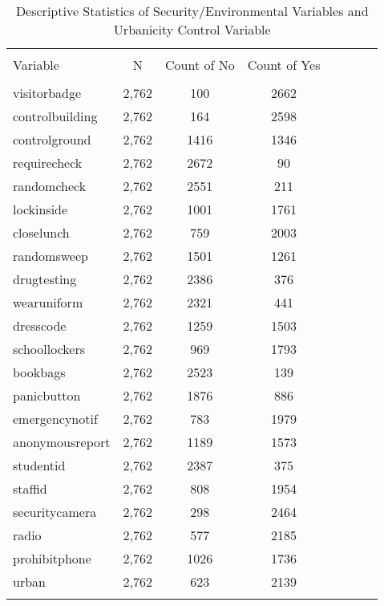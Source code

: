 \documentclass[12pt]{article}
\begin{document}
\begin{landscape}
\begin{table}[!htbp] \centering 
  \caption{Descriptive Statistics of Security/Environmental Variables and Urbanicity Control Variable} 
  \label{} 
\begin{tabular}{@{\extracolsep{5pt}}lccccccc} 
\\[-1.8ex]\hline 
\hline \\[-1.8ex] 
Variable & \multicolumn{1}{c}{N} & \multicolumn{1}{c}{Count of No} & \multicolumn{1}{c}{Count of Yes} \\ 
\hline \\[-1.8ex] 
visitorbadge & 2,762 & 100 & 2662 \\ 
controlbuilding & 2,762 & 164 & 2598 \\ 
controlground & 2,762 & 1416 & 1346 \\ 
requirecheck & 2,762 & 2672 & 90  \\ 
randomcheck & 2,762 & 2551 & 211 \\ 
lockinside & 2,762 & 1001 & 1761 \\ 
closelunch & 2,762 & 759 & 2003 \\ 
randomsweep & 2,762 & 1501 & 1261 \\ 
drugtesting & 2,762 & 2386 & 376 \\ 
wearuniform & 2,762 & 2321 & 441 \\ 
dresscode & 2,762 & 1259 & 1503 \\ 
schoollockers & 2,762 & 969 & 1793 \\ 
bookbags & 2,762 & 2523 & 139 \\ 
panicbutton & 2,762 & 1876 & 886 \\ 
emergencynotif & 2,762 & 783 & 1979 \\ 
anonymousreport & 2,762 & 1189 & 1573 \\ 
studentid & 2,762 & 2387 & 375 \\ 
staffid & 2,762 & 808 & 1954 \\ 
securitycamera & 2,762 & 298 & 2464 \\ 
radio & 2,762 & 577 & 2185 \\ 
prohibitphone & 2,762 & 1026 & 1736 \\ 
urban & 2,762 & 623 & 2139\\
\hline \\[-1.8ex] 
\end{tabular} 
\end{table} 


\end{landscape}
\end{document}
